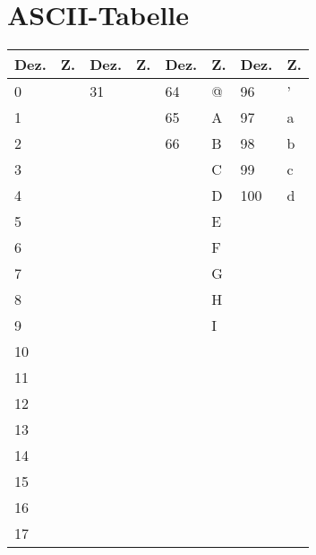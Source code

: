 \section{ASCII-Tabelle}\label{sec:ascii-tabelle}
\begin{table}[htp]
    \centering
    \begin{tabular}{|l|l||l|l||l|l||l|l|}
    \hline
    \textbf{Dez.} & \textbf{Z.} & \textbf{Dez.} & \textbf{Z.} & \textbf{Dez.} & \textbf{Z.} & \textbf{Dez.} & \textbf{Z.} \\ \hline\hline
    0    & ~       & 31   & ~       & 64   & @       & 96   & '       \\ \hline
    1    & ~       & ~    & ~       & 65   & A       & 97   & a       \\ \hline
    2    & ~       & ~    & ~       & 66   & B       & 98   & b       \\ \hline
    3    & ~       & ~    & ~       & ~    & C       & 99   & c       \\ \hline
    4    & ~       & ~    & ~       & ~    & D       & 100  & d       \\ \hline
    5    & ~       & ~    & ~       & ~    & E       & ~    & ~       \\ \hline
    6    & ~       & ~    & ~       & ~    & F       & ~    & ~       \\ \hline
    7    & ~       & ~    & ~       & ~    & G       & ~    & ~       \\ \hline
    8    & ~       & ~    & ~       & ~    & H       & ~    & ~       \\ \hline
    9    & ~       & ~    & ~       & ~    & I       & ~    & ~       \\ \hline
    10   & ~       & ~    & ~       & ~    & ~       & ~    & ~       \\ \hline
    11   & ~       & ~    & ~       & ~    & ~       & ~    & ~       \\ \hline
    12   & ~       & ~    & ~       & ~    & ~       & ~    & ~       \\ \hline
    13   & ~       & ~    & ~       & ~    & ~       & ~    & ~       \\ \hline
    14   & ~       & ~    & ~       & ~    & ~       & ~    & ~       \\ \hline
    15   & ~       & ~    & ~       & ~    & ~       & ~    & ~       \\ \hline
    16   & ~       & ~    & ~       & ~    & ~       & ~    & ~       \\ \hline
    17   & ~       & ~    & ~       & ~    & ~       & ~    & ~       \\ \hline

\end{tabular}
\end{table}
